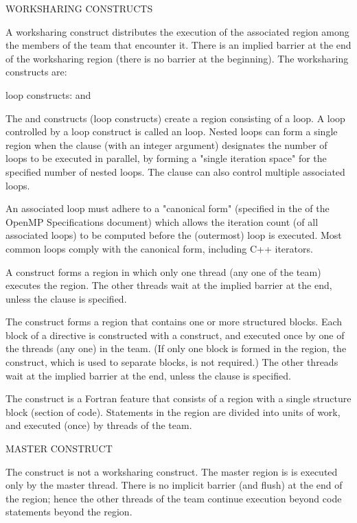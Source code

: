 WORKSHARING CONSTRUCTS

A worksharing construct distributes the execution of the associated region
among the members of the team that encounter it.  There is an
implied barrier at the end of the worksharing region
(there is no barrier at the beginning). The worksharing
constructs are:

\begin{compactitem}

\item loop constructs: { and  }
\item {}
\item {}
\item {}

\end{compactitem}

The  and  constructs (loop constructs) create a region 
consisting of a loop.  A loop controlled by a loop construct is called 
an  loop.  Nested loops can form a single region when the 
 clause (with an integer argument) designates the number of 
 loops to be executed in parallel, by forming a 
"single iteration space" for the specified number of nested loops.  
The  clause can also control multiple associated loops.

An associated loop must adhere to a "canonical form" (specified in the 
 of the OpenMP Specifications document) which allows the 
iteration count (of all associated loops) to be computed before the 
(outermost) loop is executed. %
Most common loops comply with the canonical form, including C++ iterators.

A  construct forms a region in which only one thread (any one 
of the team) executes the region. 
The other threads wait at the implied 
barrier at the end, unless the  clause is specified.

The  construct forms a region that contains one or more 
structured blocks.  Each block of a  directive is 
constructed with a  construct, and executed once by 
one of the threads (any one) in the team.  (If only one block is 
formed in the region, the  construct, which is used to
separate blocks, is not required.)
The other threads wait at the implied 
barrier at the end, unless the  clause is specified.


The  construct is a Fortran feature that consists of a
region with a single structure block (section of code). Statements in the
 region are divided into units of work, and executed (once)
by threads of the team.  

MASTER CONSTRUCT

The  construct is not a worksharing construct.  The master region is
is executed only by the master thread. There is no implicit barrier (and flush) 
at the end of the  region; hence the other threads of the team continue
execution beyond code statements beyond the  region.
